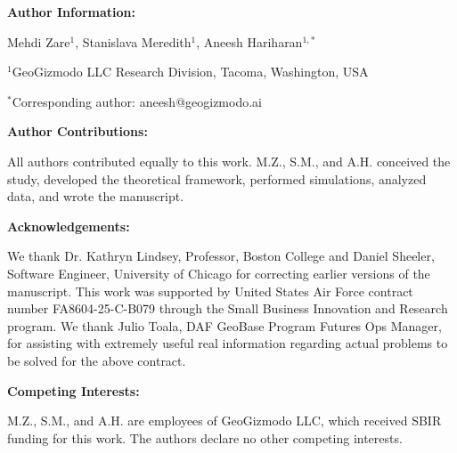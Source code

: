 \documentclass[11pt]{article}
\begin{document}
\vspace{0.4cm}

\noindent
\textbf{Author Information:}

\vspace{0.2cm}

\noindent
Mehdi Zare$^{1}$, Stanislava Meredith$^{1}$, Aneesh Hariharan$^{1,*}$

\vspace{0.2cm}

\noindent
$^{1}$GeoGizmodo LLC Research Division, Tacoma, Washington, USA

\vspace{0.2cm}

\noindent
$^{*}$Corresponding author: aneesh@geogizmodo.ai

\vspace{0.4cm}

\noindent
\textbf{Author Contributions:}

\vspace{0.2cm}

\noindent
All authors contributed equally to this work. M.Z., S.M., and A.H. conceived the study, developed the theoretical framework, performed simulations, analyzed data, and wrote the manuscript.

\vspace{0.4cm}

\noindent
\textbf{Acknowledgements:}

\vspace{0.2cm}

\noindent
We thank Dr. Kathryn Lindsey, Professor, Boston College and Daniel Sheeler, Software Engineer, University of Chicago for correcting earlier versions of the manuscript. This work was supported by United States Air Force contract number FA8604-25-C-B079 through the Small Business Innovation and Research program. We thank Julio Toala, DAF GeoBase Program Futures Ops Manager, for assisting with extremely useful real information regarding actual problems to be solved for the above contract.

\vspace{0.4cm}

\noindent
\textbf{Competing Interests:}

\vspace{0.2cm}

\noindent
M.Z., S.M., and A.H. are employees of GeoGizmodo LLC, which received SBIR funding for this work. The authors declare no other competing interests.

\vspace{0.4cm}
\end{document}
